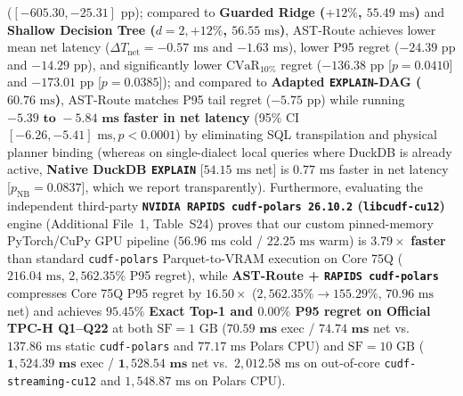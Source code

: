 \documentclass[10pt,a4paper]{article}
\begin{document}
\begin{enumerate}[leftmargin=1.5em,itemsep=0.8pt]
($[-605.30,-25.31]\text{ pp}$); compared to \textbf{Guarded Ridge ($+12\%$, $55.49\text{ ms}$)} and \textbf{Shallow Decision Tree ($d=2,+12\%$, $56.55\text{ ms}$)}, AST-Route achieves lower mean net latency ($\Delta T_{\text{net}}=-0.57\text{ ms}$ and $-1.63\text{ ms}$), lower P95 regret ($-24.39\text{ pp}$ and $-14.29\text{ pp}$), and significantly lower $\text{CVaR}_{10\%}$ regret ($-136.38\text{ pp}$ [$p=0.0410$] and $-173.01\text{ pp}$ [$p=0.0385$]); and compared to \textbf{Adapted \texttt{EXPLAIN}-DAG ($60.76\text{ ms}$)}, AST-Route matches P95 tail regret ($-5.75\text{ pp}$) while running $\mathbf{-5.39\text{ to }-5.84\text{ ms}}$ \textbf{faster in net latency} (95\% CI $[-6.26,-5.41]\text{ ms}, p<0.0001$) by eliminating SQL transpilation and physical planner binding (whereas on single-dialect local queries where DuckDB is already active, \textbf{Native DuckDB \texttt{EXPLAIN}} [$54.15\text{ ms}$ net] is $0.77\text{ ms}$ faster in net latency [$p_{\text{NB}}=0.0837$], which we report transparently). Furthermore, evaluating the independent third-party \textbf{\texttt{NVIDIA RAPIDS cudf-polars 26.10.2} (\texttt{libcudf-cu12})} engine (Additional File~1, Table~S24) proves that our custom pinned-memory PyTorch/CuPy GPU pipeline ($56.96\text{ ms}$ cold / $22.25\text{ ms}$ warm) is $\mathbf{3.79\times}$ \textbf{faster} than standard \texttt{cudf-polars} Parquet-to-VRAM execution on Core 75Q ($216.04\text{ ms}$, $2{,}562.35\%$ P95 regret), while \textbf{AST-Route + \texttt{RAPIDS cudf-polars}} compresses Core 75Q P95 regret by $\mathbf{16.50\times}$ ($2{,}562.35\%\rightarrow 155.29\%$, $70.96\text{ ms}$ net) and achieves $\mathbf{95.45\%}$ \textbf{Exact Top-1 and $\mathbf{0.00\%}$ P95 regret on Official TPC-H Q1--Q22} at both $\text{SF}=1\text{ GB}$ ($\mathbf{70.59\text{ ms}}$ exec / $\mathbf{74.74\text{ ms}}$ net vs.\ $137.86\text{ ms}$ static \texttt{cudf-polars} and $77.17\text{ ms}$ Polars CPU) and $\text{SF}=10\text{ GB}$ ($\mathbf{1{,}524.39\text{ ms}}$ exec / $\mathbf{1{,}528.54\text{ ms}}$ net vs.\ $2{,}012.58\text{ ms}$ on out-of-core \texttt{cudf-streaming-cu12} and $1{,}548.87\text{ ms}$ on Polars CPU).

\end{enumerate}
\end{document}
